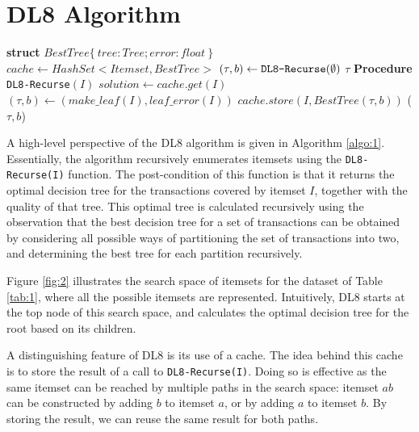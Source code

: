 \section{DL8 Algorithm}
\begin{algorithm}
	\DontPrintSemicolon
	\caption{$DL8(maxdepth, minsup)$}
	\label{algo:1}
	\textbf{struct} $BestTree\{\ tree : Tree; error : float\ \}$\;
	$cache \gets HashSet < Itemset, BestTree >$\;
	$(\tau, b) \gets \verb|DL8-Recurse|(\emptyset)$\;
	\Return $\tau$\;
	\textbf{Procedure} \texttt{DL8-Recurse}$(I)$\;
		$solution \gets cache.get(I)$\;
		$(\tau, b) \gets (make\_leaf(I), leaf\_error (I))$\;
		$cache.store(I, BestT ree(\tau, b))$\;
		\Return($\tau, b$)\;
\end{algorithm}

A high-level perspective of the DL8 algorithm is given in Algorithm \ref{algo:1}. Essentially, the algorithm recursively enumerates itemsets using the \verb|DL8-Recurse(I)| function. The post-condition of this function is that it returns the optimal decision tree for the transactions covered by itemset $I$, together with the quality of that tree. This optimal tree is calculated recursively using the observation that the best decision tree for a set of transactions can be obtained by considering all possible ways of partitioning the set of transactions into two, and determining the best tree for each partition recursively.

Figure \ref{fig:2} illustrates the search space of itemsets for the dataset of Table \ref{tab:1}, where all the possible itemsets are represented. Intuitively, DL8 starts at the top node of this search space, and calculates the optimal decision tree for the root based on its children.

A distinguishing feature of DL8 is its use of a cache. The idea behind this cache is to store the result of a call to \verb|DL8-Recurse(I)|. Doing so is effective as the same itemset can be reached by multiple paths in the search space: itemset $ab$ can be constructed by adding $b$ to itemset $a$, or by adding $a$ to itemset $b$. By storing the result, we can reuse the same result for both paths.

